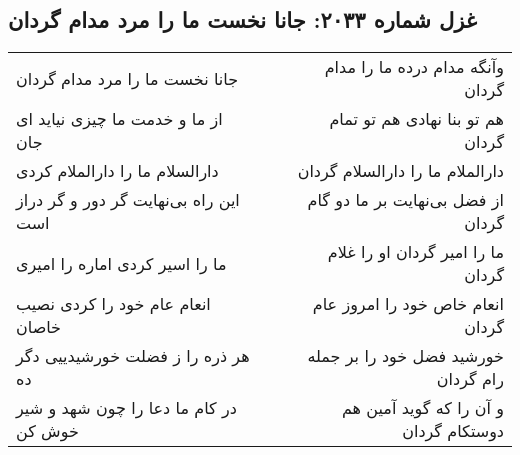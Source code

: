 \begin{center}
\section*{غزل شماره ۲۰۳۳: جانا نخست ما را مرد مدام گردان}
\label{sec:2033}
\begin{longtable}{l p{0.5cm} r}
جانا نخست ما را مرد مدام گردان
&&
وآنگه مدام درده ما را مدام گردان
\\
از ما و خدمت ما چیزی نیاید ای جان
&&
هم تو بنا نهادی هم تو تمام گردان
\\
دارالسلام ما را دارالملام کردی
&&
دارالملام ما را دارالسلام گردان
\\
این راه بی‌نهایت گر دور و گر دراز است
&&
از فضل بی‌نهایت بر ما دو گام گردان
\\
ما را اسیر کردی اماره را امیری
&&
ما را امیر گردان او را غلام گردان
\\
انعام عام خود را کردی نصیب خاصان
&&
انعام خاص خود را امروز عام گردان
\\
هر ذره را ز فضلت خورشیدییی دگر ده
&&
خورشید فضل خود را بر جمله رام گردان
\\
در کام ما دعا را چون شهد و شیر خوش کن
&&
و آن را که گوید آمین هم دوستکام گردان
\\
\end{longtable}
\end{center}

